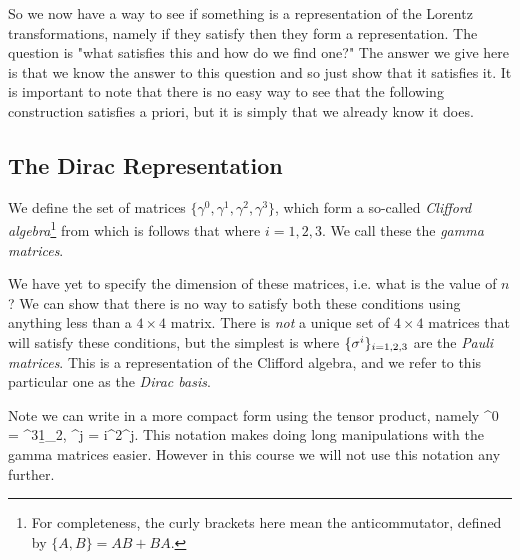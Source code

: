 So we now have a way to see if something is a representation of the Lorentz transformations, namely if they satisfy  then they form a representation. The question is "what satisfies this and how do we find one?" The answer we give here is that we know the answer to this question and so just show that it satisfies it. It is important to note that there is no easy way to see that the following construction satisfies  a priori, but it is simply that we already know it does. 

\subsection{The Dirac Representation}

We define the set of matrices $\{\gamma^0,\gamma^1,\gamma^2,\gamma^3\}$, which form a so-called \textit{Clifford algebra}\footnote{For completeness, the curly brackets here mean the anticommutator, defined by $\{A,B\}=AB+BA$.} 
\noindent from which is follows that
\noindent where $i=1,2,3$. We call these the \textit{gamma matrices}. 

We have yet to specify the dimension of these matrices, i.e. what is the value of $n$? We can show that there is no way to satisfy both these conditions using anything less than a $4\times 4$ matrix. There is \textit{not} a unique set of $4\times 4$ matrices that will satisfy these conditions, but the simplest is 
\noindent where $\{\sigma^i\}_{i=1,2,3}$ are the \textit{Pauli matrices}. This is a representation of the Clifford algebra, and we refer to this particular one as the \textit{Dirac basis}. 

\br 
    Note we can write  in a more compact form using the tensor product, namely 
    \bse 
        \gamma^0 = \sig^3\otimes \b1_{2}, \qand \gamma^j = i\sig^2\otimes \sig^j.
    \ese
    This notation makes doing long manipulations with the gamma matrices easier. However in this course we will not use this notation any further.
\er 

